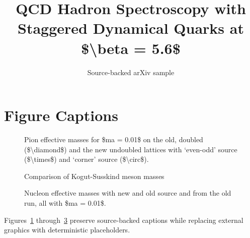 \documentclass[11pt]{article}
\title{QCD Hadron Spectroscopy with Staggered Dynamical Quarks at \$\textbackslash{}beta = 5.6\$}
\author{Source-backed arXiv sample}
\date{}
\begin{document}
\maketitle
\section{Figure Captions}

\begin{figure}[htbp]
\centering
\fbox{\rule{0pt}{1.15in}\rule{0.78\linewidth}{0pt}}
\caption{Pion effective masses for \$ma = 0.01\$ on the old, doubled (\$\textbackslash{}diamond\$) and the new undoubled lattices with `even-odd' source (\$\textbackslash{}times\$) and `corner' source (\$\textbackslash{}circ\$).}
\label{fig:source-1}
\end{figure}


\begin{figure}[htbp]
\centering
\fbox{\rule{0pt}{1.15in}\rule{0.78\linewidth}{0pt}}
\caption{Comparison of Kogut-Susskind meson masses}
\label{fig:source-2}
\end{figure}


\begin{figure}[htbp]
\centering
\fbox{\rule{0pt}{1.15in}\rule{0.78\linewidth}{0pt}}
\caption{Nucleon effective masses with new and old source and from the old run, all with \$ma = 0.01\$.}
\label{fig:source-3}
\end{figure}


Figures~\ref{fig:source-1} through~\ref{fig:source-3} preserve source-backed captions while replacing external graphics with deterministic placeholders.
\end{document}
